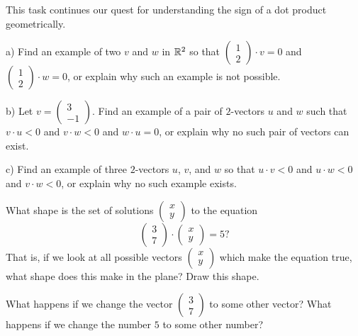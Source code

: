 \documentclass[elementsmain.tex]{subfiles}
\begin{document}
\begin{exercise} This task continues our quest for understanding the sign of a dot product geometrically.
\begin{compactitem}
\item[a)] Find an example of two $v$ and $w$ in $\mathbb{R}^2$ so that $\left(\begin{smallmatrix}1 \\ 2 \end{smallmatrix}\right)\cdot v =0$ and $\left(\begin{smallmatrix}1 \\ 2 \end{smallmatrix}\right)\cdot w = 0$, or explain why such an example is not possible.

\item[b)] Let $v = \left(\begin{smallmatrix}3\\-1 \end{smallmatrix}\right)$. Find an example of a pair of $2$-vectors $u$ and $w$ such that $v \cdot u < 0$ and $v \cdot w < 0$ and $w \cdot u = 0$, or explain why no such pair of vectors can exist.

\item[c)] Find an example of three $2$-vectors $u$, $v$, and $w$ so that $u \cdot v < 0$ and $u\cdot w < 0$ and $v \cdot w < 0$, or explain why no such example exists.
\end{compactitem}
\end{exercise}

\begin{exercise}
What shape is the set of solutions $\left(\begin{smallmatrix} x \\ y \end{smallmatrix}\right)$ to the equation
\[
\begin{pmatrix} 3 \\ 7\end{pmatrix} \cdot \begin{pmatrix} x \\ y \end{pmatrix} = 5?
\] 
That is, if we look at all possible vectors $\left(\begin{smallmatrix} x \\ y \end{smallmatrix}\right)$
which make the equation true, what shape does this make in the plane? Draw this shape.

What happens if we change the vector $\left(\begin{smallmatrix} 3 \\ 7 \end{smallmatrix}\right)$ to some other vector? What happens if we change the number $5$ to some other number?
\end{exercise}
\end{document}
